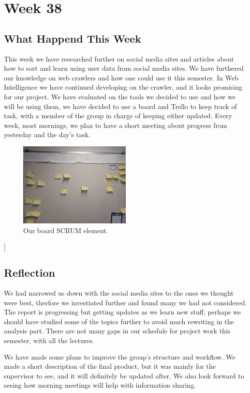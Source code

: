 \section*{Week 38} \subsection*{What Happend This Week} 
This week we have researched further on social media sites and articles about
how to sort and learn using user data from social media sites. We have furthered
our knowledge on web crawlers and how one could use it this semester. In Web
Intelligence we have continued developing on the crawler, and it looks promising
for our project. We have evaluated on the tools we decided to use and how we
will be using them, we have decided to use a board and Trello to keep track of
task, with a member of the group in charge of keeping either updated. Every
week, most mornings, we plan to have a short meeting about progress from
yesterday and the day's task.

\begin{figure}[H] \centering \includegraphics[width =
0.5\textwidth]{figures/Board.jpg}
	\caption{Our board SCRUM element.}
\end{figure}]

\subsection*{Reflection}
We had narrowed us down with the social media sites to the ones we thought were
best, therfore we investiated further and found many we had not considered. The
report is progressing but getting updates as we learn new stuff, perhaps we
should have studied some of the topics further to avoid much rewriting in the
analysis part. There are not many gaps in our schedule for project work this
semester, with all the lectures.

We have made some plans to improve the group's structure and workflow. We made a
short description of the final product, but it was mainly for the supervisor to
see, and it will definitely be updated after. We also look forward to seeing how
morning meetings will help with information sharing.

